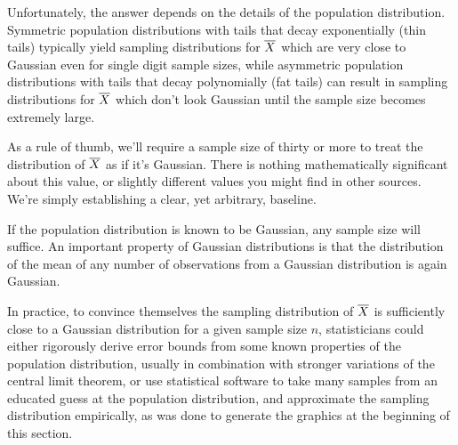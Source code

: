 Unfortunately, the answer depends on the details of the population distribution. Symmetric population distributions with tails that decay exponentially (thin tails) typically yield sampling distributions for ${\overline{X}}$ which are very close to Gaussian even for single digit sample sizes, while asymmetric population distributions with tails that decay polynomially (fat tails) can result in sampling distributions for ${\overline{X}}$ which don't look Gaussian until the sample size becomes extremely large.

As a rule of thumb, we'll require a sample size of thirty or more to treat the distribution of ${\overline{X}}$ as if it's Gaussian. There is nothing mathematically significant about this value, or slightly different values you might find in other sources. We're simply establishing a clear, yet arbitrary, baseline. 

\begin{remark}
If the population distribution is known to be Gaussian, any sample size will suffice. An important property of Gaussian distributions is that the distribution of the mean of any number of observations from a Gaussian distribution is again Gaussian.
\end{remark}

In practice, to convince themselves the sampling distribution of ${\overline{X}}$ is sufficiently close to a Gaussian distribution for a given sample size $n$, statisticians could either rigorously derive error bounds from some known properties of the population distribution, usually in combination with stronger variations of the central limit theorem, or use statistical software to take many samples from an educated guess at the population distribution, and approximate the sampling distribution empirically, as was done to generate the graphics at the beginning of this section.

